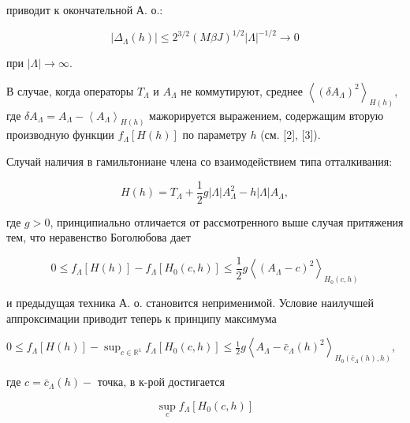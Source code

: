 \documentclass[10pt]{article}
\begin{document}
приводит к окончательной А. о.:



\[

\left|\Delta_{\Lambda}(h)\right| \leqslant 2^{3 / 2}(M \beta J)^{1 / 2}|\Lambda|^{-1 / 2} \rightarrow 0

\]



при $|\Lambda| \rightarrow \infty$.



В случае, когда операторы $T_{\Lambda}$ и $A_{\Lambda}$ не коммутируют, среднее $\left\langle\left(\delta A_{\Lambda}\right)^{2}\right\rangle_{H(h)}$, где $\delta A_{\Lambda}=A_{\Lambda}-\left\langle A_{\Lambda}\right\rangle_{H(h)}$ мажорируется выражением, содержащим вторую производную функции $f_{\Lambda}[H(h)]$ по параметру $h$ (см. [2], [3]).



Случай наличия в гамильтониане члена со взаимодействием типа отталкивания:



\[

H(h)=T_{\Lambda}+\frac{1}{2} g|\Lambda| A_{\Lambda}^{2}-h|\Lambda| A_{\Lambda},

\]



где $g>0$, принципиально отличается от рассмотренного выше случая притяжения тем, что неравенство Боголюбова дает



\[

0 \leqslant f_{\Lambda}[H(h)]-f_{\Lambda}\left[H_{0}(c, h)\right] \leqslant \frac{1}{2} g\left\langle\left(A_{\Lambda}-c\right)^{2}\right\rangle_{H_{0}(c, h)}

\]



и предыдущая техника А. о. становится неприменимой. Условие наилучшей аппроксимации приводит теперь к принципу максимума



$0 \leqslant f_{\Lambda}[H(h)]-\sup _{c \in \mathbb{R}^{1}} f_{\Lambda}\left[H_{0}(c, h)\right] \leqslant \frac{1}{2} g\left\langle A_{\Lambda}-\bar{c}_{\Lambda}(h)^{2}\right\rangle_{H_{0}\left(\bar{c}_{\Lambda}(h), h\right)}$,



где $c=\bar{c}_{\Lambda}(h)-$ точка, в к-рой достигается



\[

\sup _{c} f_{\Lambda}\left[H_{0}(c, h)\right]

\]
\end{document}
